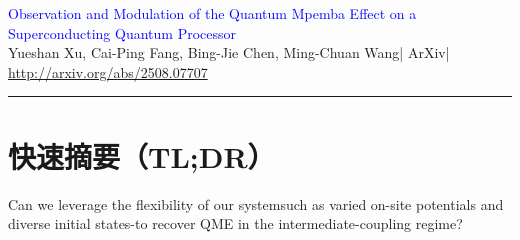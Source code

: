 \documentclass[11pt,a4paper]{article}
\newcommand{\PaperMeta}{}
\newcommand{\PaperTitle}{}
\newcommand{\PaperAuthors}{}
\newcommand{\PaperVenue}{}
\newcommand{\PaperYear}{}
\newcommand{\PaperLink}{}
\begin{document}
\renewcommand{\PaperTitle}{Observation and Modulation of the Quantum Mpemba Effect on a Superconducting Quantum Processor}
\renewcommand{\PaperAuthors}{Yueshan Xu, Cai-Ping Fang, Bing-Jie Chen, Ming-Chuan Wang}
\renewcommand{\PaperVenue}{ArXiv}
\renewcommand{\PaperYear}{2025}
\renewcommand{\PaperLink}{http://arxiv.org/abs/2508.07707}
\renewcommand{\PaperMeta}{\PaperTitle\ --- \PaperYear}

\newcommand{\paperpath}{D:/B_Dr/arXiv-2508.07707v1/}
\graphicspath{{\paperpath}}

\begin{center}
    {\LARGE \textcolor{blue}{\PaperTitle}}\\[6pt]
    {\small \PaperAuthors \quad | \quad \PaperVenue \quad | \quad \PaperYear}\\
    {\small \url{\PaperLink}}
\end{center}

\tableofcontents
\vspace{6pt}
\hrule
\vspace{10pt}

\section{快速摘要（TL;DR）}

Can we leverage the flexibility of our systemsuch as varied on-site potentials and diverse initial states-to recover QME in the intermediate-coupling regime?
\end{document}
